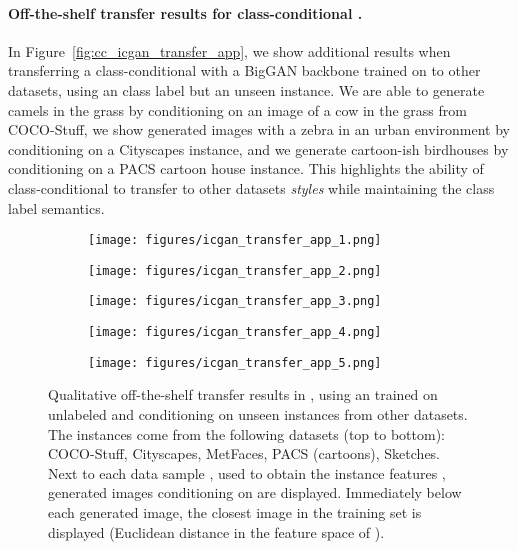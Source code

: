 \paragraph{Off-the-shelf transfer results for class-conditional \ours.} In Figure~\ref{fig:cc_icgan_transfer_app}, we show additional results when transferring a class-conditional \ours with a BigGAN backbone trained on \ImNet to other datasets, using an \ImNet class label but an unseen instance. We are able to generate camels in the grass by conditioning on an image of a cow in the grass from COCO-Stuff, we show generated images with a zebra in an urban environment by conditioning on a Cityscapes instance, and we generate cartoon-ish birdhouses by conditioning on a PACS cartoon house instance. This highlights the ability of class-conditional \ours to transfer to other datasets \emph{styles} while maintaining the class label semantics. 
 
 
 \begin{figure}
\centering
\begin{subfigure}{1\textwidth}
 \centering
\texttt{[image: figures/icgan\_transfer\_app\_1.png]}
\end{subfigure}
\begin{subfigure}{1\textwidth}
 \centering
\texttt{[image: figures/icgan\_transfer\_app\_2.png]}
\end{subfigure}
\begin{subfigure}{1\textwidth}
 \centering
\texttt{[image: figures/icgan\_transfer\_app\_3.png]}
\end{subfigure}
\begin{subfigure}{1\textwidth}
 \centering
\texttt{[image: figures/icgan\_transfer\_app\_4.png]}
\end{subfigure}
\begin{subfigure}{1\textwidth}
 \centering
\texttt{[image: figures/icgan\_transfer\_app\_5.png]}
\end{subfigure}
\caption{Qualitative off-the-shelf transfer results in , using an \ours trained on unlabeled \ImNet and conditioning on unseen instances from other datasets. The instances come from the following datasets (top to bottom): COCO-Stuff, Cityscapes, MetFaces, PACS (cartoons), Sketches. 
Next to each data sample , used to obtain the instance features , generated images conditioning on  are displayed. Immediately below each generated image, the closest image in the \ImNet training set is displayed (Euclidean distance in the feature space of ).
}
\label{fig:icgan_transfer_app}
\end{figure}

